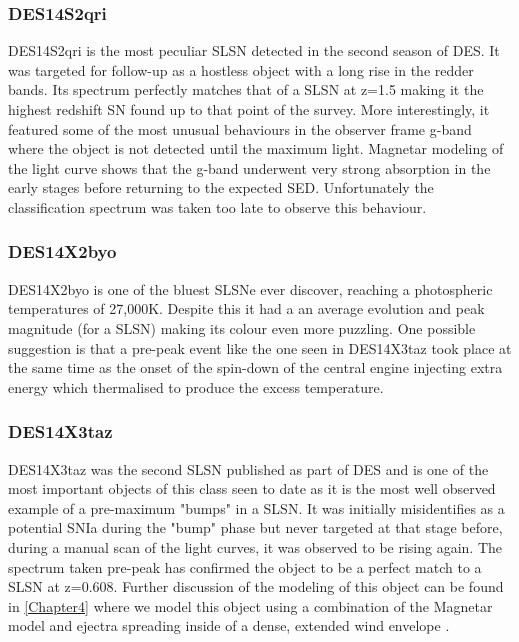 \subsubsection{DES14S2qri}
DES14S2qri is the most peculiar SLSN detected in the second season of DES. It was targeted for follow-up as a hostless object with a long rise in the redder bands. Its spectrum perfectly matches that of a SLSN at z=1.5 making it the highest redshift SN found up to that point of the survey. More interestingly, it featured some of the most unusual behaviours in the observer frame g-band where the object is not detected until the maximum light. Magnetar modeling of the light curve shows that the g-band underwent very strong absorption in the early stages before returning to the expected SED. Unfortunately the classification spectrum was taken too late to observe this behaviour.

\subsubsection{DES14X2byo}
DES14X2byo is one of the bluest SLSNe ever discover, reaching a photospheric temperatures of 27,000K. Despite this it had a an average evolution and peak magnitude (for a SLSN) making its colour even more puzzling. One possible suggestion is that a pre-peak event like the one seen in DES14X3taz took place at the same time as the onset of the spin-down of the central engine injecting extra energy which thermalised to produce the excess temperature.     

\subsubsection{DES14X3taz}
DES14X3taz was the second SLSN published as part of DES and is one of the most important objects of this class seen to date as it is the most well observed example of a pre-maximum "bumps" in a SLSN. It was initially misidentifies as a potential SNIa during the "bump" phase but never targeted at that stage before, during a manual scan of the light curves, it was observed to be rising again. The spectrum taken pre-peak has confirmed the object to be a perfect match to a SLSN at z=0.608. Further discussion of the modeling of this object can be found in \cref{Chapter4} where we model this object using a combination of the Magnetar model and ejectra spreading inside of a dense, extended wind envelope \citep{Piro2015}.

